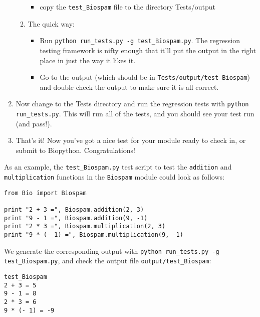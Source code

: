 \documentclass{report}
\begin{document}
\begin{enumerate}
\begin{enumerate}
\begin{itemize}
     \item copy the \verb|test_Biospam| file to the directory Tests/output
    
   \end{itemize}

   \item The quick way:

   \begin{itemize}
      \item Run \verb|python run_tests.py -g test_Biospam.py|. The
            regression testing framework is nifty enough that it'll put
            the output in the right place in just the way it likes it.  
      
       \item Go to the output (which should be in \verb|Tests/output/test_Biospam|) and double check the output to make sure it is all correct.

   \end{itemize}

 \end{enumerate}
      
 \item Now change to the Tests directory and run the regression tests
       with \verb|python run_tests.py|. This will run all of the tests, and
       you should see your test run (and pass!).
      
  \item That's it! Now you've got a nice test for your module ready to check in,
  or submit to Biopython.  Congratulations!
\end{enumerate}

As an example, the \verb|test_Biospam.py| test script to test the
\verb|addition| and \verb|multiplication| functions in the \verb|Biospam|
module  could look as follows:

\begin{verbatim}
from Bio import Biospam

print "2 + 3 =", Biospam.addition(2, 3)
print "9 - 1 =", Biospam.addition(9, -1)
print "2 * 3 =", Biospam.multiplication(2, 3)
print "9 * (- 1) =", Biospam.multiplication(9, -1)
\end{verbatim}

We generate the corresponding output with \verb|python run_tests.py -g test_Biospam.py|, and check the output file \verb|output/test_Biospam|:

\begin{verbatim}
test_Biospam
2 + 3 = 5
9 - 1 = 8
2 * 3 = 6
9 * (- 1) = -9
\end{verbatim}
\end{document}
